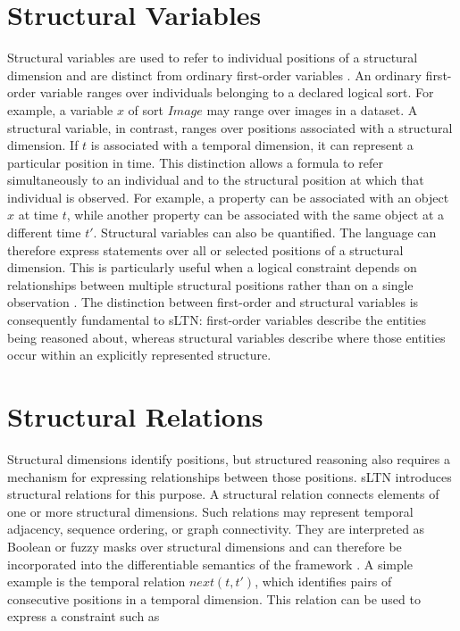 \section{Structural Variables}
\noindent
Structural variables are used to refer to individual positions of a structural dimension and are distinct from ordinary first-order variables \cite{rinaldi2026sltn}.
An ordinary first-order variable ranges over individuals belonging to a declared logical sort. For example, a variable $x$ of sort $\mathit{Image}$ may range over images in a dataset. A structural variable, in contrast, ranges over positions associated with a structural dimension. If $t$ is associated with a temporal dimension, it can represent a particular position in time.
This distinction allows a formula to refer simultaneously to an individual and to the structural position at which that individual is observed. For example, a property can be associated with an object $x$ at time $t$, while another property can be associated with the same object at a different time $t'$.
Structural variables can also be quantified. The language can therefore express statements over all or selected positions of a structural dimension. This is particularly useful when a logical constraint depends on relationships between multiple structural positions rather than on a single observation \cite{rinaldi2026sltn}.
The distinction between first-order and structural variables is consequently fundamental to sLTN: first-order variables describe the entities being reasoned about, whereas structural variables describe where those entities occur within an explicitly represented structure.

\section{Structural Relations}
\noindent
Structural dimensions identify positions, but structured reasoning also requires a mechanism for expressing relationships between those positions. sLTN introduces structural relations for this purpose.
A structural relation connects elements of one or more structural dimensions. Such relations may represent temporal adjacency, sequence ordering, or graph connectivity. They are interpreted as Boolean or fuzzy masks over structural dimensions and can therefore be incorporated into the differentiable semantics of the framework \cite{rinaldi2026sltn}.
A simple example is the temporal relation $\mathit{next}(t,t')$, which identifies pairs of consecutive positions in a temporal dimension. This relation can be used to express a constraint such as

